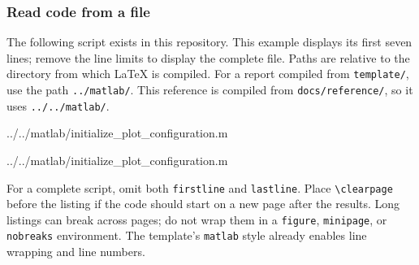 \subsubsection*{Read code from a file}
The following script exists in this repository. This example displays its
first seven lines; remove the line limits to display the complete file.
Paths are relative to the directory from which LaTeX is compiled.
For a report compiled from \texttt{template/}, use the path
\texttt{../matlab/}. This reference is compiled from
\texttt{docs/reference/}, so it uses \texttt{../../matlab/}.
\begin{referencecode}

    {../../matlab/initialize_plot_configuration.m}
\end{referencecode}


    {../../matlab/initialize_plot_configuration.m}

For a complete script, omit both \texttt{firstline} and \texttt{lastline}.
Place \verb|\clearpage| before the listing if the code should start on a
new page after the results. Long listings can break across pages; do not
wrap them in a \texttt{figure}, \texttt{minipage}, or \texttt{nobreaks}
environment. The template's \texttt{matlab} style already enables line
wrapping and line numbers.

